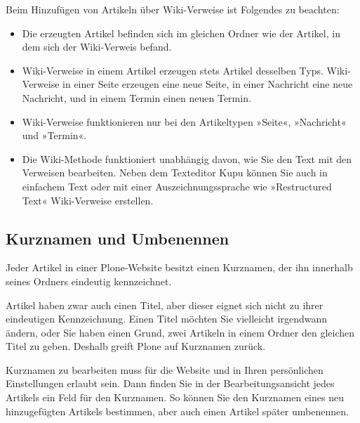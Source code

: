 \documentclass[a4paper,12pt,ngerman]{manual}
\begin{document}
Beim Hinzufügen von Artikeln über Wiki-Verweise ist Folgendes zu beachten:
\begin{itemize}
\item {} 
Die erzeugten Artikel befinden sich im gleichen Ordner wie der Artikel,
in dem sich der Wiki-Verweis befand.

\item {} 
Wiki-Verweise in einem Artikel erzeugen stets Artikel desselben Typs.
Wiki-Verweise in einer Seite erzeugen eine neue Seite, in einer Nachricht
eine neue Nachricht, und in einem Termin einen neuen Termin.

\item {} 
Wiki-Verweise funktionieren nur bei den Artikeltypen »Seite«,
»Nachricht« und »Termin«.

\item {} 
Die Wiki-Methode funktioniert unabhängig davon, wie Sie den Text mit
den Verweisen bearbeiten. Neben dem Texteditor Kupu können Sie auch in
einfachem Text oder mit einer Auszeichnungssprache wie »Restructured Text«
Wiki-Verweise erstellen.

\end{itemize}
\hypertarget{sec-kurzname}{}

\subsection{Kurznamen und Umbenennen}

Jeder Artikel in einer Plone-Website besitzt einen Kurznamen, der ihn
innerhalb seines Ordners eindeutig kennzeichnet.

Artikel haben zwar auch einen Titel, aber dieser eignet sich nicht zu
ihrer eindeutigen Kennzeichnung. Einen Titel möchten Sie vielleicht
irgendwann ändern, oder Sie haben einen Grund, zwei Artikeln in einem
Ordner den gleichen Titel zu geben. Deshalb greift Plone auf Kurznamen
zurück.

Kurznamen zu bearbeiten muss für die Website und in Ihren persönlichen
Einstellungen erlaubt sein. Dann finden Sie in der Bearbeitungsansicht jedes
Artikels ein Feld für den Kurznamen. So können Sie den Kurznamen eines neu
hinzugefügten Artikels bestimmen, aber auch einen Artikel später umbenennen.
\end{document}

